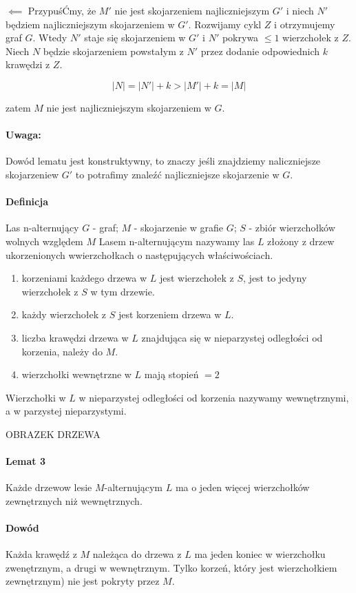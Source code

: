 $\impliedby$ PrzypuśĆmy, że $M'$ nie jest skojarzeniem najliczniejszym  $G'$ i niech $N'$ będziem najliczniejszym skojarzeniem w $G'$.
Rozwijamy cykl $Z$ i otrzymujemy graf $G$. Wtedy $N'$ staje się skojarzeniem w $G'$ i  $N'$ pokrywa $\leq 1$ wierzchołek z $Z$. 
Niech $N$ będzie skojarzeniem powstałym z $N'$ przez dodanie odpowiednich $k$ krawędzi z $Z$.

$$ |N| = |N'| + k > |M'| + k = |M| $$ 

zatem $M$ nie jest najliczniejszym skojarzeniem w $G$.

\paragraph{Uwaga:}
Dowód lematu jest konstruktywny, to znaczy jeśli znajdziemy naliczniejsze skojarzeniew $G'$ to potrafimy znaleźć najliczniejsze skojarzenie w $G$.

\paragraph{Definicja}{Las n-alternujący}
$G$ - graf; $M$ - skojarzenie w grafie $G$; $S$ - zbiór wierzchołków wolnych względem $M$
Lasem n-alternującym nazywamy las $L$ złożony z drzew ukorzenionych wwierzchołkach o następujących właściwościach.
\begin{enumerate}
	\item korzeniami każdego drzewa w $L$ jest wierzchołek z $S$, jest to jedyny wierzchołek z $S$ w tym drzewie.
	\item każdy wierzchołek z $S$ jest korzeniem drzewa w $L$.
	\item liczba krawędzi drzewa w $L$ znajdująca się w nieparzystej odległości od korzenia, należy do $M$.
	\item wierzchołki wewnętrzne w $L$ mają stopień $= 2$
\end{enumerate} 
Wierzchołki w $L$ w nieparzystej odległości od korzenia nazywamy wewnętrznymi, a w parzystej nieparzystymi.

OBRAZEK DRZEWA

\paragraph{Lemat 3}
Każde drzewow lesie $M$-alternującym $L$ ma o jeden więcej wierzchołków zewnętrznych niż wewnętrznych.
\paragraph{Dowód}
Każda krawędź z $M$ należąca do drzewa z $L$ ma jeden koniec w wierzchołku zwenętrznym, a drugi w wewnętrznym. 
Tylko korzeń, który jest wierzchołkiem zewnętrznym) nie jest pokryty przez $M$.

